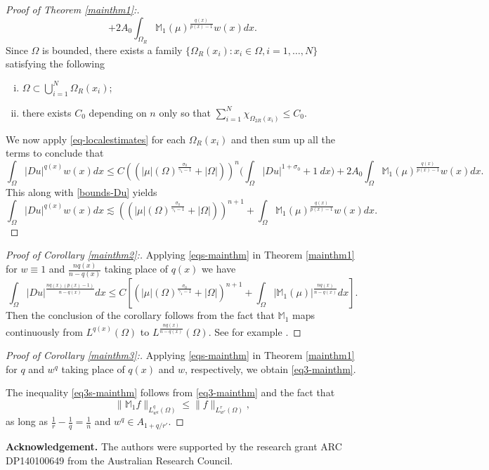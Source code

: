 \documentclass[a4paper,10pt]{amsart}
\newcommand{\Mu}{\mathbb{M}_1(\mu)}
\newcommand{\lesi}{\lesssim}
\newcommand{\px}{p(x)}
\newcommand{\f}{\frac}
\newcommand{\Om}{\Omega}
\begin{document}
\begin{proof}[Proof of Theorem \ref{mainthm1}:]
\begin{equation}
	    +2A_0 \int_{\Om_R}\Mu^{\f{q(x)}{\px-1}}w(x)dx.
	    \end{equation}
	    Since $\Om$ is bounded, there exists a family $\{\Om_R(x_i): x_i\in \Om, i=1,\ldots, N\}$ satisfying the following
	    \begin{enumerate}[(i)]
	    	\item $\Om \subset \bigcup_{i=1}^N \Om_R(x_i)$;
	    	\item there exists $C_0$ depending on $n$ only so that $\sum_{i=1}^N \chi_{\Om_{2R}(x_i)}\leq C_0$.
	    \end{enumerate}
	    We now apply \eqref{eq-localestimates} for each $\Om_{R}(x_i)$ and then sum up all the terms to conclude that
	    $$
	    \int_{\Om}|Du|^{q(x)}w(x)dx \leq C((|\mu|(\Om)^{\f{\sigma_0}{\gamma_1-1}}+|\Om|))^{n}\Big(\int_{\Om}|Du|^{1+\sigma_0} + 1 \ dx\Big)
	    +2A_0 \int_{\Om}\Mu^{\f{q(x)}{\px-1}}w(x)dx.
	    $$
	    This along with \eqref{bounds-Du} yields
	    $$
	    \int_{\Om}|Du|^{q(x)}w(x)dx \lesi ((|\mu|(\Om)^{\f{\sigma_0}{\gamma_1-1}}+|\Om|))^{n+1}
	    + \int_{\Om}\Mu^{\f{q(x)}{\px-1}}w(x)dx.
	    $$
	\end{proof}
	
	\begin{proof}
		[Proof of Corollary \ref{mainthm2}:] 
Applying  \eqref{eqs-mainthm} in Theorem \ref{mainthm1} for $w\equiv 1$ and $\f{nq(x)}{n-q(x)}$ taking place of $q(x)$ we have
		$$
		\int_{\Om} |Du|^{\f{nq(x)(\px-1)}{n-q(x)}}dx \leq C\left[(|\mu|(\Om)^{\f{\sigma_0}{\gamma_1-1}}+|\Om|)^{n+1} + \int_{\Om} |\Mu|^{\f{nq(x)}{n-q(x)}}dx\right].
		$$
		Then the conclusion of the corollary follows from the fact that $\mathbb{M}_1$ maps continuously from $L^{q(x)}(\Om)$ to $L^{\f{nq(x)}{n-q(x)}}(\Om)$. See for example \cite[Theorem 1.3]{CCF}.
	\end{proof}
		
		\bigskip
		
		\begin{proof}[Proof of Corollary \ref{mainthm3}:] 
			Applying  \eqref{eqs-mainthm} in Theorem \ref{mainthm1} for $q$ and $w^q$ taking place of $q(x)$ and $w$, respectively, we obtain \eqref{eq3-mainthm}.
				
				The inequality 	\eqref{eq3s-mainthm} follows from \eqref{eq3-mainthm} and the fact that
				$$
				\|\mathbb{M}_1f\|_{L^q_{w^q}(\Om)}\leq \|f\|_{L^r_{w^r}(\Om)},
				$$
			as long as $\f{1}{r}-\f{1}{q}=\f{1}{n}$ and $w^q\in A_{1+q/r'}$.
				\end{proof}
				
				
			\bigskip
			
		
		
		
		\bigskip
		
			
	\textbf{Acknowledgement.} The authors were supported by the research grant ARC DP140100649 from the Australian Research Council.%
\end{document}

